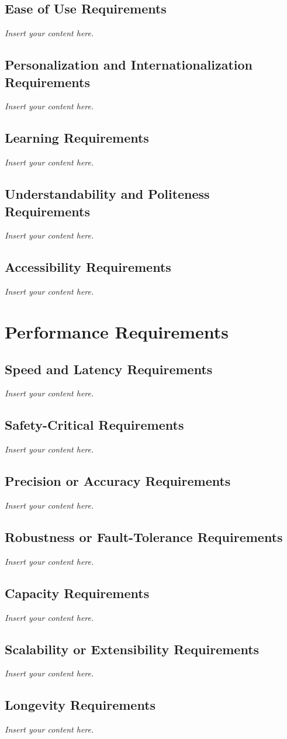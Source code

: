 \documentclass[12pt]{article}
\newcommand{\lips}{\textit{Insert your content here.}}
\begin{document}
\subsection{Ease of Use Requirements}
\lips
\subsection{Personalization and Internationalization Requirements}
\lips
\subsection{Learning Requirements}
\lips
\subsection{Understandability and Politeness Requirements}
\lips
\subsection{Accessibility Requirements}
\lips

\section{Performance Requirements}
\subsection{Speed and Latency Requirements}
\lips
\subsection{Safety-Critical Requirements}
\lips
\subsection{Precision or Accuracy Requirements}
\lips
\subsection{Robustness or Fault-Tolerance Requirements}
\lips
\subsection{Capacity Requirements}
\lips
\subsection{Scalability or Extensibility Requirements}
\lips
\subsection{Longevity Requirements}
\lips
\end{document}
